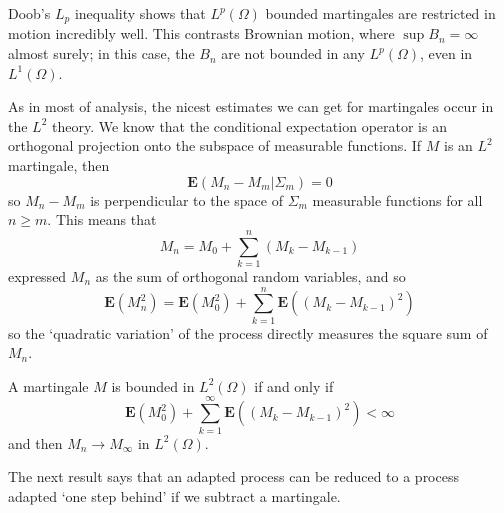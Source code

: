 Doob's $L_p$ inequality shows that $L^p(\Omega)$ bounded martingales are restricted in motion incredibly well. This contrasts Brownian motion, where $\sup B_n = \infty$ almost surely; in this case, the $B_n$ are not bounded in any $L^p(\Omega)$, even in $L^1(\Omega)$.

As in most of analysis, the nicest estimates we can get for martingales occur in the $L^2$ theory. We know that the conditional expectation operator is an orthogonal projection onto the subspace of measurable functions. If $M$ is an $L^2$ martingale, then
%
\[ \mathbf{E}(M_n - M_m | \Sigma_m) = 0 \]
%
so $M_n - M_m$ is perpendicular to the space of $\Sigma_m$ measurable functions for all $n \geq m$. This means that
%
\[ M_n = M_0 + \sum_{k = 1}^n (M_k - M_{k-1}) \]
%
expressed $M_n$ as the sum of orthogonal random variables, and so
%
\[ \mathbf{E}(M_n^2) = \mathbf{E}(M_0^2) + \sum_{k = 1}^n \mathbf{E}((M_k - M_{k-1})^2) \]
%
so the `quadratic variation' of the process directly measures the square sum of $M_n$.

\begin{theorem}
    A martingale $M$ is bounded in $L^2(\Omega)$ if and only if
    \[ \mathbf{E}(M_0^2) + \sum_{k = 1}^\infty \mathbf{E}((M_k - M_{k-1})^2) < \infty \]
    and then $M_n \to M_\infty$ in $L^2(\Omega)$.
\end{theorem}

The next result says that an adapted process can be reduced to a process adapted `one step behind' if we subtract a martingale.

